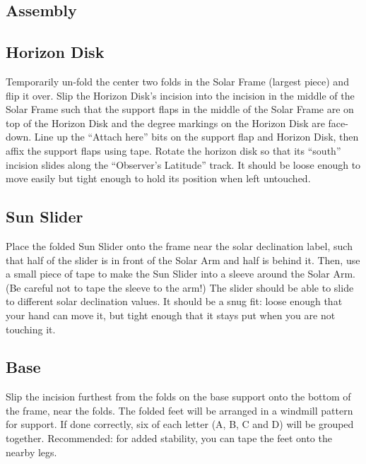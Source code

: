 \documentclass[tikz]{article}
\begin{document}
\begin{multicols}{2}
	
	
	
	\section{Assembly}
	\subsection{Horizon Disk}
	Temporarily un-fold the center two folds in the Solar Frame (largest piece) and flip it over. Slip the Horizon Disk's incision into the incision in the middle of the Solar Frame such that the support flaps in the middle of the Solar Frame are on top of the Horizon Disk and the degree markings on the Horizon Disk are face-down. Line up the ``Attach here'' bits on the support flap and Horizon Disk, then affix the support flaps using tape. Rotate the horizon disk so that its ``south'' incision slides along the ``Observer's Latitude'' track. It should be loose enough to move easily but tight enough to hold its position when left untouched.
	
	\subsection{Sun Slider}
	Place the folded Sun Slider onto the frame near the solar declination label, such that half of the slider is in front of the Solar Arm and half is behind it. Then, use a small piece of tape to make the Sun Slider into a sleeve around the Solar Arm. (Be careful not to tape the sleeve to the arm!) The slider should be able to slide to different solar declination values. It should be a snug fit: loose enough that your hand can move it, but tight enough that it stays put when you are not touching it. 
	
	\subsection{Base}
	Slip the incision furthest from the folds on the base support onto the bottom of the frame, near the folds. The folded feet will be arranged in a windmill pattern for support. If done correctly, six of each letter (A, B, C and D) will be grouped together. Recommended: for added stability, you can tape the feet onto the nearby legs. 
	

\end{multicols}
\end{document}
